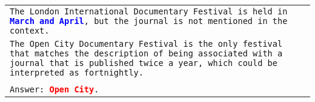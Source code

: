 \begin{table*}
\begin{tabular}{>{\raggedright\arraybackslash\tt}p{}<{}}
      The London International Documentary Festival is held in \textcolor{blue}{\textbf{March and April}}, but the journal is not mentioned in the context. \\
      The Open City Documentary Festival is the only festival that matches the description of being associated with a journal that is published twice a year, which could be interpreted as fortnightly. \\
      \\
      Answer: \textcolor{red}{\textbf{Open City}}. \\
      \bottomrule
    \end{tabular}
    \label{tab:bad-example}
\end{table*}


